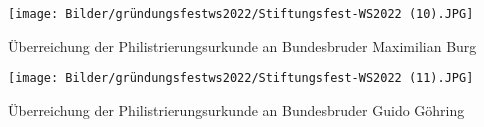 	\newpage

\begin{center}
\begin{figurehere}
  \texttt{[image: Bilder/gründungsfestws2022/Stiftungsfest-WS2022 (10).JPG]}
  \caption{Überreichung der Philistrierungsurkunde an Bundesbruder Maximilian Burg}
\end{figurehere}
\end{center}

\begin{center}
\begin{figurehere}
  \texttt{[image: Bilder/gründungsfestws2022/Stiftungsfest-WS2022 (11).JPG]}
  \caption{Überreichung der Philistrierungsurkunde an Bundesbruder  Guido Göhring}
\end{figurehere}
\end{center}	

%
